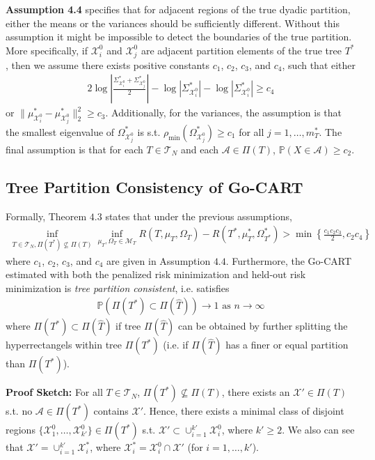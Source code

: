 \textbf{Assumption 4.4} specifies that for adjacent regions of the true dyadic partition, either the means or the variances should be sufficiently different. Without this assumption it might be impossible to detect the boundaries of the true partition. More specifically, if $\mathcal{X}_i^0$ and $\mathcal{X}_j^0$ are adjacent partition elements of the true tree $T^*$, then we assume there exists positive constants $c_1$, $c_2$, $c_3$, and $c_4$, such that either
\begin{align}
    2 \log \left| \frac{\Sigma_{\mathcal{X}_i^0}^* + \Sigma_{\mathcal{X}_j^0}^*}{2}  \right| - \log \left| \Sigma_{\mathcal{X}_i^0}^*  \right| - \log \left| \Sigma_{\mathcal{X}_i^0}^*  \right| \geq c_4
\end{align}
or $\| \mu_{\mathcal{X}_i^0}^* - \mu_{\mathcal{X}_j^0}^* \|_2^2 \geq c_3$. Additionally, for the variances, the assumption is that the smallest eigenvalue of $\Omega_{\mathcal{X}_j^0}^*$ is s.t. $\rho_{\text{min}}(\Omega_{\mathcal{X}_j^0}^*) \geq c_1$ for all $j=1,\ldots,m_T^*$. The final assumption is that for each $T \in \mathcal{T}_N$ and each $\mathcal{A} \in \Pi(T)$, $\mathbb{P}(X\in \mathcal{A}) \geq c_2$.


\subsection{Tree Partition Consistency of Go-CART}

Formally, Theorem $4.3$ states that under the previous assumptions, 
\begin{align}
    \inf_{T \in \mathcal{T}_N, \Pi(T^*) \nsubseteq \Pi(T)}
    \inf_{\mu_T, \Omega_T \in \mathcal{M}_T }
    R(T,\mu_T,\Omega_T) - R(T^*,\mu_T^*,\Omega_{T^*}^*) > \min \left\{ \frac{c_1 c_2 c_3}{2}, c_2 c_4  \right\}
\end{align}
where $c_1$, $c_2$, $c_3$, and $c_4$ are given in Assumption $4.4$. Furthermore, the Go-CART estimated with both the penalized risk minimization and held-out risk minimization is \emph{tree partition consistent}, i.e. satisfies
\begin{align}
    \mathbb{P}\left( \Pi(T^*) \subset \Pi(\hat{T}) \right) \rightarrow 1 \text{ as } n\rightarrow \infty
\end{align}
where $\Pi(T^*) \subset \Pi(\hat{T})$ if tree $\Pi(\hat{T})$ can be obtained by further splitting the hyperrectangels within tree $\Pi(T^*)$ (i.e. if $\Pi(\hat{T})$ has a finer or equal partition than $\Pi(T^*)$).


\textbf{Proof Sketch:} For all $T \in \mathcal{T}_N$, $\Pi(T^*) \nsubseteq \Pi(T)$, there exists an $\mathcal{X}' \in \Pi(T)$ s.t. no $\mathcal{A} \in \Pi(T^*)$ contains $\mathcal{X}'$. Hence, there exists a minimal class of disjoint regions $\{ \mathcal{X}_1^0,\ldots,\mathcal{X}_{k'}^0 \} \in \Pi(T^*)$ s.t. $\mathcal{X}' \subset \cup_{i=1}^{k'} \mathcal{X}_i^0$, where $k' \geq 2$. We also can see that $\mathcal{X}' = \cup_{i=1}^{k'} \mathcal{X}_i^*$, where $\mathcal{X}_i^* = \mathcal{X}_i^0 \cap \mathcal{X}'$ (for $i=1,\ldots,k'$).


